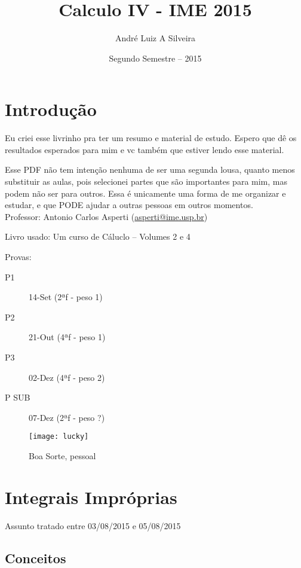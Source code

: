 \documentclass[12pt,openany]{book}
\title{Calculo IV - IME 2015}
\author{André Luiz A Silveira}
\date{Segundo Semestre -- 2015}
\begin{document}
\maketitle

\tableofcontents

\chapter{Introdução}
\label{chap:c1}

\hspace{5mm} Eu criei esse livrinho pra ter um resumo e material de estudo. Espero que dê os resultados esperados para mim e vc também que estiver lendo esse material. 

Esse PDF não tem intenção nenhuma de ser uma segunda lousa, quanto menos substituir as aulas, pois selecionei partes que são importantes para mim, mas podem não ser para outros. Essa é unicamente uma forma de me organizar e estudar, e que PODE ajudar a outras pessoas em outros momentos.\\

Professor: 	Antonio Carlos Asperti (\href{mailto:asperti@ime.usp.br}{asperti@ime.usp.br})

Livro usado: Um curso de Cáluclo -- Volumes 2 e 4

Provas:
\begin{description}
\item[P1] 14-Set (2ªf - peso 1)
\item[P2] 21-Out (4ªf - peso 1)
\item[P3] 02-Dez (4ªf - peso 2)
\item[P SUB] 07-Dez (2ªf - peso ?)
\end{description}

\begin{figure}
\centering
\texttt{[image: lucky]}
\caption{Boa Sorte, pessoal}
\label{fig:lucky}
\end{figure}



\chapter{Integrais Impróprias}
\label{chap:c2}

\hspace{5mm} Assunto tratado entre 03/08/2015 e 05/08/2015
\section{Conceitos}
\label{sec:s21}
\end{document}
